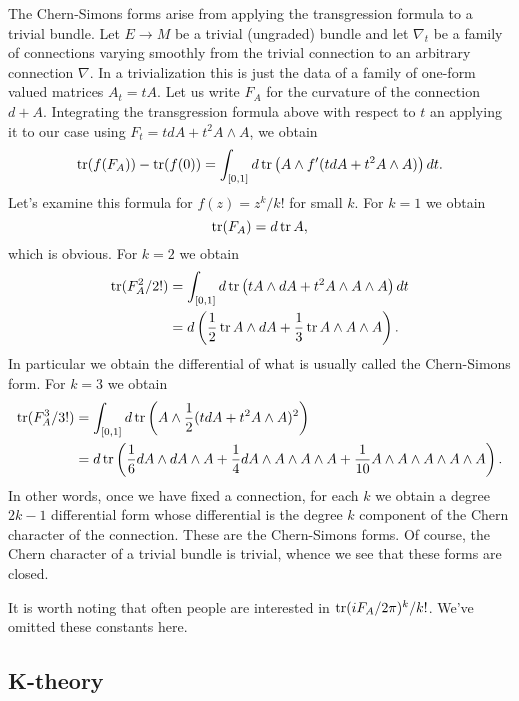 \documentclass{amsart}
\begin{document}
The Chern-Simons forms arise from applying the transgression formula
to a trivial bundle. Let $E\to M$ be a trivial (ungraded) bundle and let
$\nabla_t$ be a family of connections varying smoothly from the trivial
connection to an arbitrary connection $\nabla$. In a trivialization this
is just the data of a family of one-form valued matrices $A_t= tA$.
Let us write $F_A$ for the curvature of the connection $d+A$.
Integrating the transgression formula above with respect to $t$ an applying
it to our case using $F_t=tdA+t^2A\wedge A$, we obtain
\begin{equation*}
    \operatorname{tr}(f(F_A)) - \operatorname{tr}(f(0)) = \int_{[0,1]}d\operatorname{tr}\left( A\wedge f'(tdA+t^2A\wedge A) \right) dt.
\end{equation*}
Let's examine this formula for $f(z)=z^k/k!$ for small $k$. For $k=1$ we obtain
\begin{equation*}
    \operatorname{tr}(F_A) = d \operatorname{tr} A,
\end{equation*}
which is obvious. For $k=2$ we obtain
\begin{align*}
    \operatorname{tr}(F_A^2/2!) &= \int_{[0,1]} d\operatorname{tr}\left( tA\wedge dA+t^2A\wedge A\wedge A \right)dt \\
    &= d\left( \frac{1}{2}\operatorname{tr} A\wedge dA+\frac{1}{3}\operatorname{tr} A\wedge A\wedge A \right).
\end{align*}
In particular we obtain the differential of what is usually called the Chern-Simons form.
For $k=3$ we obtain
\begin{align*}
    \operatorname{tr}(F_A^3/3!) &= \int_{[0,1]} d\operatorname{tr}\left(  A\wedge \frac{1}{2}(tdA+t^2A\wedge A)^2\right)\\
    &= d\operatorname{tr}\left( \frac{1}{6}dA\wedge dA\wedge A + \frac{1}{4}dA\wedge A\wedge A\wedge A
    + \frac{1}{10}A\wedge A\wedge A\wedge A\wedge A\right).
\end{align*}
In other words, once we have fixed a connection, for each $k$ we obtain a degree $2k-1$
differential form whose differential is the degree $k$ component of the Chern character
of the connection. These are the Chern-Simons forms. Of course, the Chern character of
a trivial bundle is trivial, whence we see that these forms are closed.

It is worth noting that often people are interested in $\operatorname{tr} (iF_A/2\pi)^k/k!$. We've
omitted these constants here.

\subsection{K-theory}
\end{document}

